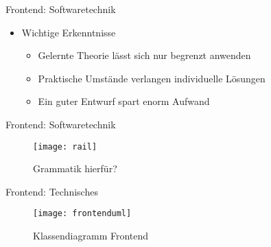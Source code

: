 \pagebreak
\begin{frame}{Frontend: Softwaretechnik}

	\begin{itemize}
		\item Wichtige Erkenntnisse
		\pause
		\begin{itemize}
			\item Gelernte Theorie l\"asst sich nur begrenzt anwenden
			\pause
			\item Praktische Umst\"ande verlangen individuelle L\"osungen
			\pause
			\item Ein guter Entwurf spart enorm Aufwand
		\end{itemize}
	\end{itemize}
	
\pagebreak

\end{frame}

\begin{frame}{Frontend: Softwaretechnik}

\begin{figure}
  \begin{center}
    \leavevmode
      \texttt{[image: rail]}
    \caption{Grammatik hierf\"ur?}
  \end{center}
\end{figure}

	
\end{frame}

\begin{frame}{Frontend: Technisches}

\begin{figure}
  \begin{center}
    \leavevmode
      \texttt{[image: frontenduml]}
    \caption{Klassendiagramm Frontend}
  \end{center}
\end{figure}

\end{frame}

